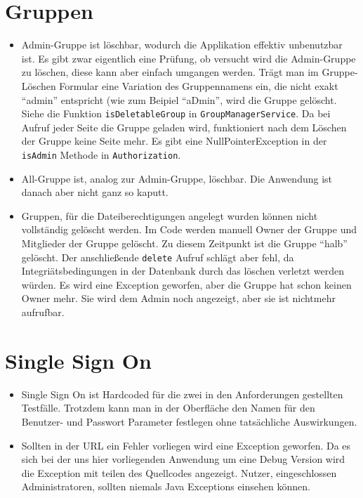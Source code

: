 \documentclass[12pt,DIV14,BCOR10mm,a4paper,parskip=half-,headsepline,headinclude,english,ngerman,bibliography=totocnumbered]{scrreprt}
\begin{document}
\section{Gruppen}
\begin{itemize}
\item Admin-Gruppe ist löschbar, wodurch die Applikation effektiv unbenutzbar ist. Es gibt zwar eigentlich eine Prüfung, ob versucht wird die Admin-Gruppe zu löschen, diese kann aber einfach umgangen werden. Trägt man im Gruppe-Löschen Formular eine Variation des Gruppennamens ein, die nicht exakt \enquote{admin} entspricht (wie zum Beipiel \enquote{aDmin}, wird die Gruppe gelöscht. Siehe die Funktion \texttt{isDeletableGroup} in \texttt{GroupManagerService}. Da bei Aufruf jeder Seite die Gruppe geladen wird, funktioniert nach dem Löschen der Gruppe keine Seite mehr. Es gibt eine NullPointerException in der \texttt{isAdmin} Methode in \texttt{Authorization}.
\item All-Gruppe ist, analog zur Admin-Gruppe, löschbar. Die Anwendung ist danach aber nicht ganz so kaputt.
\item Gruppen, für die Dateiberechtigungen angelegt wurden können nicht vollständig gelöscht werden. Im Code werden manuell Owner der Gruppe und Mitglieder der Gruppe gelöscht. Zu diesem Zeitpunkt ist die Gruppe \enquote{halb} gelöscht. Der anschließende \texttt{delete} Aufruf schlägt aber fehl, da Integriätsbedingungen in der Datenbank durch das löschen verletzt werden würden. Es wird eine Exception geworfen, aber die Gruppe hat schon keinen Owner mehr. Sie wird dem Admin noch angezeigt, aber sie ist nichtmehr aufrufbar.
\end{itemize}

\section{Single Sign On}
\begin{itemize}
 \item Single Sign On ist Hardcoded für die zwei in den Anforderungen gestellten Testfälle. Trotzdem kann man in der Oberfläche den Namen für den Benutzer- und Passwort Parameter festlegen ohne tatsächliche Auswirkungen.
  \item Sollten in der URL ein Fehler vorliegen wird eine Exception geworfen. Da es sich bei der uns hier vorliegenden Anwendung um eine Debug Version wird die Exception mit teilen des Quellcodes angezeigt. Nutzer, eingeschlossen Administratoren, sollten niemals Java Exceptions einsehen können.
 \end{itemize}
\end{document}
